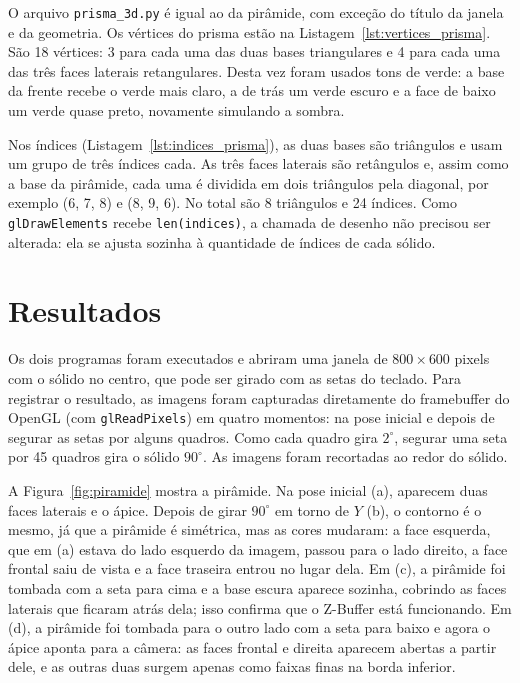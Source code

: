 \documentclass{article}
\begin{document}
O arquivo \texttt{prisma\_3d.py} é igual ao da pirâmide, com exceção do título da janela e da geometria. Os vértices do prisma estão na Listagem~\ref{lst:vertices_prisma}. São 18 vértices: 3 para cada uma das duas bases triangulares e 4 para cada uma das três faces laterais retangulares. Desta vez foram usados tons de verde: a base da frente recebe o verde mais claro, a de trás um verde escuro e a face de baixo um verde quase preto, novamente simulando a sombra.



Nos índices (Listagem~\ref{lst:indices_prisma}), as duas bases são triângulos e usam um grupo de três índices cada. As três faces laterais são retângulos e, assim como a base da pirâmide, cada uma é dividida em dois triângulos pela diagonal, por exemplo (6, 7, 8) e (8, 9, 6). No total são 8 triângulos e 24 índices. Como \texttt{glDrawElements} recebe \texttt{len(indices)}, a chamada de desenho não precisou ser alterada: ela se ajusta sozinha à quantidade de índices de cada sólido.



\section{Resultados}

Os dois programas foram executados e abriram uma janela de $800\times600$ pixels com o sólido no centro, que pode ser girado com as setas do teclado. Para registrar o resultado, as imagens foram capturadas diretamente do framebuffer do OpenGL (com \texttt{glReadPixels}) em quatro momentos: na pose inicial e depois de segurar as setas por alguns quadros. Como cada quadro gira $2^\circ$, segurar uma seta por 45 quadros gira o sólido $90^\circ$. As imagens foram recortadas ao redor do sólido.

A Figura~\ref{fig:piramide} mostra a pirâmide. Na pose inicial (a), aparecem duas faces laterais e o ápice. Depois de girar $90^\circ$ em torno de $Y$ (b), o contorno é o mesmo, já que a pirâmide é simétrica, mas as cores mudaram: a face esquerda, que em (a) estava do lado esquerdo da imagem, passou para o lado direito, a face frontal saiu de vista e a face traseira entrou no lugar dela. Em (c), a pirâmide foi tombada com a seta para cima e a base escura aparece sozinha, cobrindo as faces laterais que ficaram atrás dela; isso confirma que o Z-Buffer está funcionando. Em (d), a pirâmide foi tombada para o outro lado com a seta para baixo e agora o ápice aponta para a câmera: as faces frontal e direita aparecem abertas a partir dele, e as outras duas surgem apenas como faixas finas na borda inferior.
\end{document}
